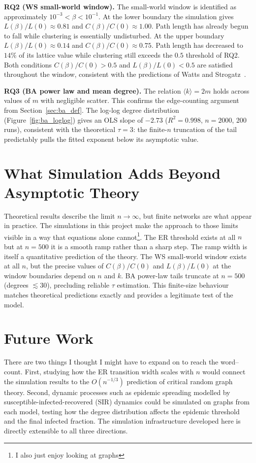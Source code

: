 \documentclass[12pt, a4paper]{report}
\theoremstyle{definition}
\theoremstyle{plain}
\theoremstyle{remark}
\begin{document}
\textbf{RQ2 (WS small-world window).} The small-world window
is identified as approximately $10^{-3} < \beta < 10^{-1}$.
At the lower boundary the simulation gives
$L(\beta)/L(0) \approx 0.81$ and $C(\beta)/C(0) \approx 1.00$.
Path length has already begun to fall while clustering is
essentially undisturbed.  At the upper boundary
$L(\beta)/L(0) \approx 0.14$ and $C(\beta)/C(0) \approx 0.75$.
Path length has decreased to $14\%$ of its lattice value while
clustering still exceeds the $0.5$ threshold of RQ2.
Both conditions $C(\beta)/C(0) > 0.5$ and
$L(\beta)/L(0) < 0.5$ are satisfied
throughout the window, consistent with the
predictions of Watts and Strogatz~\cite{watts1998}.

\textbf{RQ3 (BA power law and mean degree).} The relation
$\langle k \rangle = 2m$ holds across values of
$m$ with negligible scatter. This confirms the edge-counting
argument from Section~\ref{sec:ba_def}. The log-log degree distribution
(Figure~\ref{fig:ba_loglog}) gives an OLS slope of $-2.73$
($R^2 = 0.998$, $n = 2000$, 200 runs), consistent with the
theoretical $\tau = 3$: the finite-$n$ truncation of the tail
predictably pulls the fitted exponent below its asymptotic value.

\section*{What Simulation Adds Beyond Asymptotic Theory}

Theoretical results describe the limit $n \to \infty$, but
finite networks are what appear in practice. The simulations
in this project make the approach to those limits visible in
a way that equations alone cannot\footnote{I also just enjoy
looking at graphs}. The ER threshold exists
at all $n$ but at $n = 500$ it is a smooth ramp rather than
a sharp step. The ramp width is itself a quantitative
prediction of the theory. The WS small-world window exists at
all $n$, but the precise values of $C(\beta)/C(0)$ and
$L(\beta)/L(0)$ at the window boundaries depend on $n$ and
$k$. BA power-law tails truncate at $n=500$ (degrees $\lesssim 30$),
precluding reliable $\tau$ estimation. This finite-size behaviour
matches theoretical predictions exactly and provides a legitimate
test of the model.

\section*{Future Work}

There are two things I thought I might have to expand on
to reach the word--count. First, studying how the
ER transition width scales with $n$
would connect the simulation results to the $O(n^{-1/3})$
prediction of critical random graph theory. Second, dynamic
processes such as epidemic spreading modelled by
susceptible-infected-recovered (SIR) dynamics could be
simulated on graphs from each model, testing how the degree
distribution affects the epidemic threshold and the final
infected fraction. The simulation infrastructure developed
here is directly extensible to all three directions.
\end{document}
